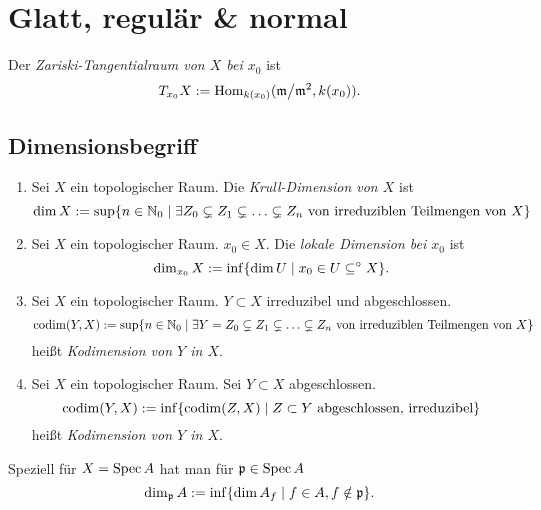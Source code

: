 \section{Glatt, regulär \& normal} %

\begin{definition}
    Der \emph{Zariski-Tangentialraum von $X$ bei $x_0$} ist
    \[T_{x_0} X := \operatorname{Hom}_{k(x_0)}(\mathfrak{m}\big/\mathfrak{m}^2, k(x_0)).\]
\end{definition}

\subsection{Dimensionsbegriff}

\begin{definition}
\begin{enumerate}[label=(\roman*)]
  \item Sei $X$ ein topologischer Raum. Die \emph{Krull-Dimension von $X$} ist
    \[\dim X := \sup\{n\in\mathbb{N}_0 \mid
        \exists Z_0 \subsetneq Z_1 \subsetneq \ldots \subsetneq Z_n
        \text{ von irreduziblen Teilmengen von $X$}\}\]
  \item Sei $X$ ein topologischer Raum. $x_0 \in X$. Die 
    \emph{lokale Dimension bei $x_0$} ist
    \[\dim_{x_0} X := \inf\{\dim U \mid x_0\in U \subseteq^\circ X\}.\]
  \item Sei $X$ ein topologischer Raum. $Y\subset X$ irreduzibel und
    abgeschlossen. 
    \[\operatorname{codim}(Y,X) := \sup\{n\in\mathbb{N}_0 \mid
        \exists Y = Z_0 \subsetneq Z_1 \subsetneq \ldots \subsetneq Z_n
        \text{ von irreduziblen Teilmengen von $X$}\}\]
    heißt \emph{Kodimension von $Y$ in $X$}.
  \item Sei $X$ ein topologischer Raum. Sei $Y\subset X$ abgeschlossen.
    \[\operatorname{codim}(Y,X) := \inf\{ \operatorname{codim}(Z,X) \mid Z\subset Y 
        \text{ abgeschlossen, irreduzibel}\}\]
    heißt \emph{Kodimension von $Y$ in $X$}. 
\end{enumerate}
\end{definition}

\begin{bemerkung}
    Speziell für $X = \operatorname{Spec} A$ hat man
    für $\mathfrak{p} \in \operatorname{Spec} A$
    \[\dim_\mathfrak{p} A := \inf \{\dim A_f \mid f \in A, f\notin\mathfrak{p}\}.\]
\end{bemerkung}

